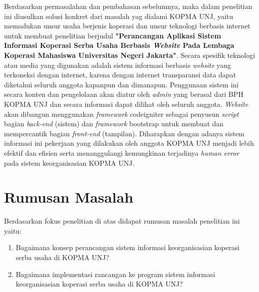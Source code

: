 Berdasarkan permasalahan  dan pembahasan sebelumnya, maka dalam penelitian ini diusulkan solusi konkret dari masalah yag dialami KOPMA UNJ, yaitu memadukan unsur usaha berjenis koperasi dan unsur teknologi berbasis internet untuk membuat penelitian berjudul \textbf{"Perancangan Aplikasi Sistem Informasi Koperasi Serba Usaha Berbasis \emph{Website} Pada Lembaga Koperasi Mahasiswa Universitas Negeri Jakarta"}. Secara spesifik teknologi atau media yang digunakan adalah sistem informasi berbasis \emph{website} yang terkoneksi dengan internet, karena dengan internet transparansi data dapat diketahui seluruh anggota kapanpun dan dimanapun. Penggunaan sistem ini secara konten dan pengelolaan akan diatur oleh \emph{admin} yang berasal dari BPH KOPMA UNJ dan secara informasi dapat dilihat oleh seluruh anggota. \emph{Website} akan dibangun menggunakan \emph{framework} codeigniter sebagai penyusun \emph{script} bagian \emph{back-end} (sistem) dan \emph{framework} bootstrap untuk membuat dan mempercantik bagian \emph{front-end} (tampilan). Diharapkan dengan adanya sistem informasi ini pekerjaan yang dilakukan oleh anggota KOPMA UNJ menjadi lebih efektif dan efisien serta menanggulangi kemungkinan terjadinya \emph{human error} pada sistem keorganisasian KOPMA UNJ.

\section{Rumusan Masalah}
Berdasarkan fokus penelitian di atas didapat rumusan masalah penelitian ini yaitu:

\begin{enumerate}
	\item Bagaimana konsep perancangan sistem informasi keorganisasian koperasi serba usaha di KOPMA UNJ?
	\item Bagaimana implementasi rancangan ke program sistem informasi keorganisasian koperasi serba usaha di KOPMA UNJ?
\end{enumerate}

